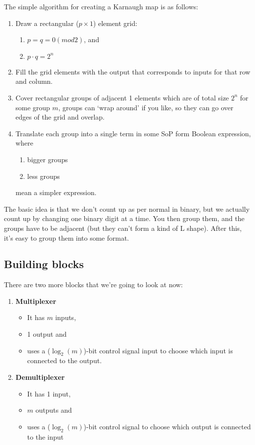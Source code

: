 \documentclass[11pt,a4paper,titlepage,dvipsnames,cmyk]{scrartcl}
\begin{document}
The simple algorithm for creating a Karnaugh map is as follows:
\begin{enumerate}
    \item Draw a rectangular ($p \times 1$) element grid:
    \begin{enumerate}
        \item $p = q = 0 (mod 2)$, and
        \item $p \cdot q = 2^n$
    \end{enumerate}
    \item Fill the grid elements with the output that corresponds to
        inputs for that row and column.
    \item Cover rectangular groups of
        adjacent 1 elements which are of total size $2^n$ for some group
        $m$, groups can `wrap around' if you like, so they can go over
        edges of the grid and overlap.
    \item Translate each group into a single term in some SoP form Boolean
        expression, where
    \begin{enumerate}
        \item bigger groups
        \item less groups
    \end{enumerate}
    mean a simpler expression.
\end{enumerate}

The basic idea is that we don't count up as per normal in binary, but we
actually count up by changing one binary digit at a time. You then group
them, and the groups have to be adjacent (but they can't form a kind of L
shape). After this, it's easy to group them into some format.

\subsection{Building blocks}%
\label{sub:blocks}

There are two more blocks that we're going to look at now:
\begin{enumerate}
    \item \textbf{Multiplexer}
        \begin{itemize}
            \item It has $m$ inputs,
            \item 1 output and
            \item uses a ($\log_2(m)$)-bit control signal input to choose
                which input is connected to the output.
        \end{itemize}
    \item \textbf{Demultiplexer}
        \begin{itemize}
            \item It has 1 input,
            \item $m$ outputs and
            \item uses a ($\log_2(m)$)-bit control signal to choose which
                output is connected to the input
        \end{itemize}
\end{enumerate}
\end{document}
